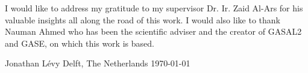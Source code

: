 I would like to address my gratitude to my supervisor Dr. Ir. Zaid Al-Ars for his valuable insights all along the road of this work. I would also like to thank Nauman Ahmed who has been the scientific adviser and the creator of GASAL2 and GASE, on which this work is based. 

Jonathan Lévy
Delft, The Netherlands
\today